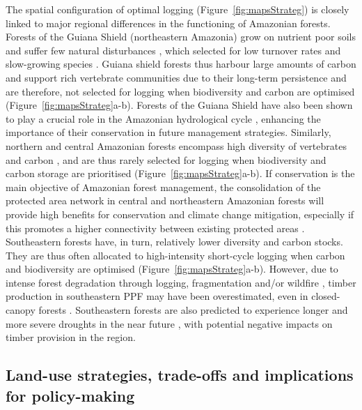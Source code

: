 \documentclass{article}
\begin{document}
The spatial configuration of optimal logging (Figure~\ref{fig:mapsStrateg}) is closely linked to major regional differences in the functioning of Amazonian forests. Forests of the Guiana Shield (northeastern Amazonia) grow on nutrient poor soils and suffer few natural disturbances \cite{Espirito-Santo2014}, which selected for low turnover rates and slow-growing species \cite{Grau2018}. Guiana shield forests thus harbour large amounts of carbon \cite{Avtabile2018} and support rich vertebrate communities \cite{Denis2018} due to their long-term persistence \cite{Barthe2017} and are therefore, not selected for logging when biodiversity and carbon are optimised (Figure~\ref{fig:mapsStrateg}a-b). Forests of the Guiana Shield have also been shown to play a crucial role in the Amazonian hydrological cycle \cite{Bovolo2018,Staal2018}, enhancing the importance of their conservation in future management strategies. Similarly, northern and central Amazonian forests encompass high diversity of vertebrates \cite{Jenkins2013} and carbon \cite{Avitabile2016}, and are thus rarely selected for logging when biodiversity and carbon storage are prioritised (Figure~\ref{fig:mapsStrateg}a-b). If conservation is the main objective of Amazonian forest management, the consolidation of the protected area network in central and northeastern Amazonian forests will provide high benefits for conservation and climate change mitigation, especially if this promotes a higher connectivity between existing protected areas \cite{Hansen2007}. Southeastern forests have, in turn, relatively lower diversity and carbon stocks. They are thus often allocated to high-intensity short-cycle logging when carbon and biodiversity are optimised (Figure~\ref{fig:mapsStrateg}a-b). However, due to intense forest degradation through logging, fragmentation and/or wildfire \cite{Davidson2012,Foley2007}, timber production in southeastern PPF may have been overestimated, even in closed-canopy forests \cite{Asner2004}. Southeastern forests are also predicted to experience longer and more severe droughts in the near future \cite{Duffy2015}, with potential negative impacts on timber provision in the region.  
 
\subsection{Land-use strategies, trade-offs and implications for policy-making}
\end{document}
